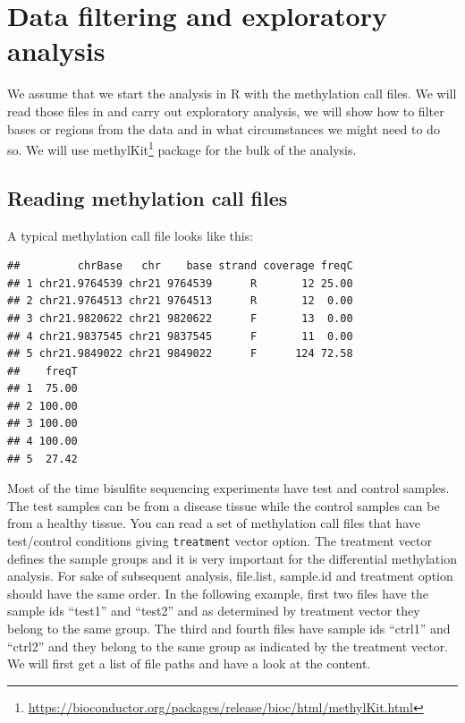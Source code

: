 \documentclass[12pt,]{krantz}
\renewcommand{\href}[2]{#2\footnote{\url{#1}}}
\begin{document}
\hypertarget{data-filtering-and-exploratory-analysis}{%
\section{Data filtering and exploratory analysis}\label{data-filtering-and-exploratory-analysis}}

We assume that we start the analysis in R with the methylation call files. We will read those files in and carry out exploratory analysis, we will show how to filter bases or regions from the data and in what circumstances we might need to do so. We will use \href{https://bioconductor.org/packages/release/bioc/html/methylKit.html}{methylKit}\citep{Akalin2012-af} package for the bulk of the analysis.

\hypertarget{reading-methylation-call-files}{%
\subsection{Reading methylation call files}\label{reading-methylation-call-files}}

A typical methylation call file looks like this:

\begin{verbatim}
##         chrBase   chr    base strand coverage freqC
## 1 chr21.9764539 chr21 9764539      R       12 25.00
## 2 chr21.9764513 chr21 9764513      R       12  0.00
## 3 chr21.9820622 chr21 9820622      F       13  0.00
## 4 chr21.9837545 chr21 9837545      F       11  0.00
## 5 chr21.9849022 chr21 9849022      F      124 72.58
##    freqT
## 1  75.00
## 2 100.00
## 3 100.00
## 4 100.00
## 5  27.42
\end{verbatim}

Most of the time bisulfite sequencing experiments have test and control samples. The test samples can be from a disease tissue while the control samples can be from a healthy tissue. You can read a set of methylation call files that have test/control conditions giving \texttt{treatment} vector option. The treatment vector defines the sample groups and it is very important for the differential methylation analysis. For sake of subsequent analysis, file.list, sample.id and treatment option should have the same order. In the following example, first two files have the sample ids ``test1'' and ``test2'' and as determined by treatment vector they belong to the same group. The third and fourth files have sample ids ``ctrl1'' and ``ctrl2'' and they belong to the same group as indicated by the treatment vector. We will first get a list of file paths and have a look at the content.
\end{document}
